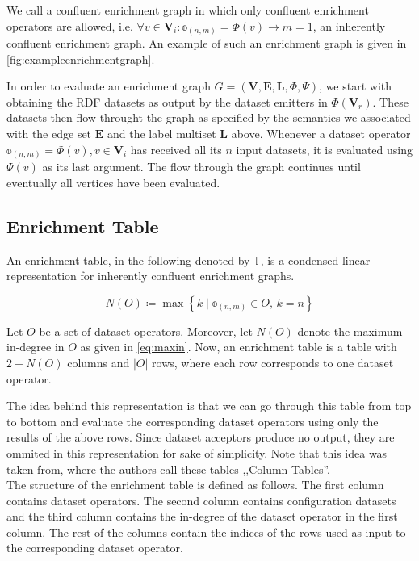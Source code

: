 We call a confluent enrichment graph in which only confluent enrichment operators are allowed, i.e. $\forall v \in \mathbf{V}_i \colon \mathbb{o}_{(n,m)} = \Phi(v) \to m = 1$, an inherently confluent enrichment graph.
An example of such an enrichment graph is given in \autoref{fig:exampleenrichmentgraph}.

In order to evaluate an enrichment graph $G=(\mathbf{V},\mathbf{E},\mathbf{L},\Phi,\Psi)$, we start with obtaining the \ac{RDF} datasets as output by the dataset emitters in $\Phi(\mathbf{V}_r)$.
These datasets then flow throught the graph as specified by the semantics we associated with the edge set $\mathbf{E}$ and the label multiset $\mathbf{L}$ above.
Whenever a dataset operator $\mathbb{o}_{(n,m)}=\Phi(v), v\in\mathbf{V}_i$ has received all its $n$ input datasets, it is evaluated using $\Psi(v)$ as its last argument.
The flow through the graph continues until eventually all vertices have been evaluated.

\subsection{Enrichment Table}
\label{ssec:enrichmenttable}

An enrichment table, in the following denoted by $\mathbb{T}$, is a condensed linear representation for inherently confluent enrichment graphs.

\begin{equation}
  N(O) \coloneq \max \left\{ k \mid \mathbb{o}_{(n,m)} \in O, \, k=n \right\}
  \label{eq:maxin}
\end{equation}

Let $O$ be a set of dataset operators.
Moreover, let $N(O)$ denote the maximum in-degree in $O$ as given in \ref{eq:maxin}.
Now, an enrichment table is a table with $2+N(O)$ columns and $|O|$ rows, where each row corresponds to one dataset operator.

The idea behind this representation is that we can go through this table from top to bottom and evaluate the corresponding  dataset operators using only the results of the above rows.
Since dataset acceptors produce no output, they are ommited in this representation for sake of simplicity.
Note that this idea was taken from\cite{kvasnieka:1998a}, where the authors call these tables ,,Column Tables''. \\

The structure of the enrichment table is defined as follows.
The first column contains dataset operators.
The second column contains configuration datasets and the third column contains the in-degree of the dataset operator in the first column.
The rest of the columns contain the indices of the rows used as input to the corresponding dataset operator.

